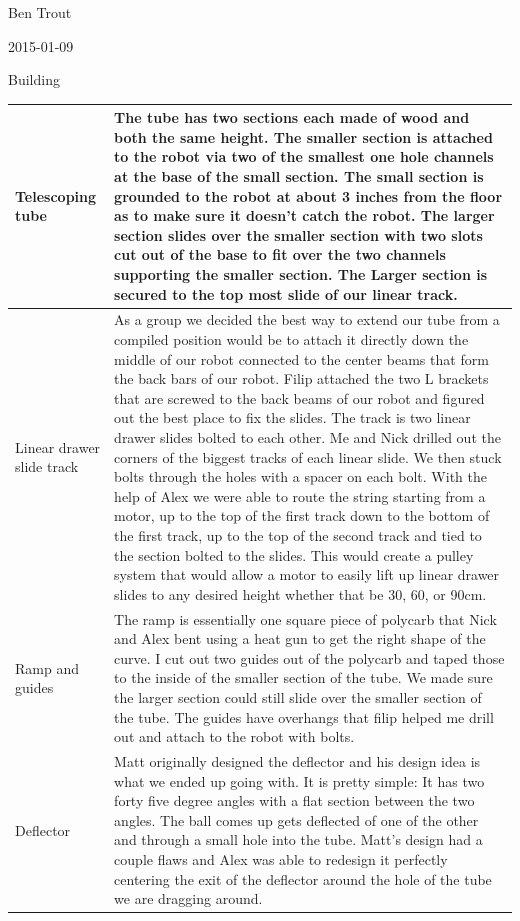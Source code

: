 Ben Trout

2015-01-09

Building

\begin{tabular}{|p{4cm}|p{8cm}|}
\hline
Telescoping tube&
The tube has two sections each made of wood and both the same height. The smaller section is attached to the robot via two of the smallest one hole channels at the base of the small section. The small section is grounded to the robot at about 3 inches from the floor as to make sure it doesn’t catch the robot. The larger section slides over the smaller section with two slots cut out of the base to fit over the two channels supporting the smaller section. The Larger section is secured to the top most slide of our linear track. 
\\
\hline
Linear drawer slide track&
As a group we decided the best way to extend our tube from a compiled position would be to attach it directly down the middle of our robot connected to the center beams that form the back bars of our robot. Filip attached the two L brackets that are screwed to the back beams of our robot and figured out the best place to fix the slides. The track is two linear drawer slides bolted to each other. Me and Nick drilled out the corners of the biggest tracks of each linear slide. We then stuck bolts through the holes with a spacer on each bolt. With the help of Alex we were able to route the string starting from a motor, up to the top of the first track down to the bottom of the first track, up to the top of the second track and tied to the section bolted to the slides. This would create a pulley system that would allow a motor to easily lift up linear drawer slides to any desired height whether that be 30, 60, or 90cm. 
\\
\hline
Ramp and guides&
The ramp is essentially one square piece of polycarb that Nick and Alex bent using a heat gun to get the right shape of the curve. I cut out two guides out of the polycarb and taped those to the inside of the smaller section of the tube. We made sure the larger section could still slide over the smaller section of the tube. The guides have overhangs that filip helped me drill out and attach to the robot with bolts.
\\
\hline
Deflector&
Matt originally designed the deflector and his design idea is what we ended up going with. It is pretty simple: It has two forty five degree angles with a flat section between the two angles. The ball comes up gets deflected of one of the other and through a small hole into the tube. Matt’s design had a couple flaws and Alex was able to redesign it perfectly centering the exit of the deflector around the hole of the tube we are dragging around. 
\\
\hline
\end{tabular}


